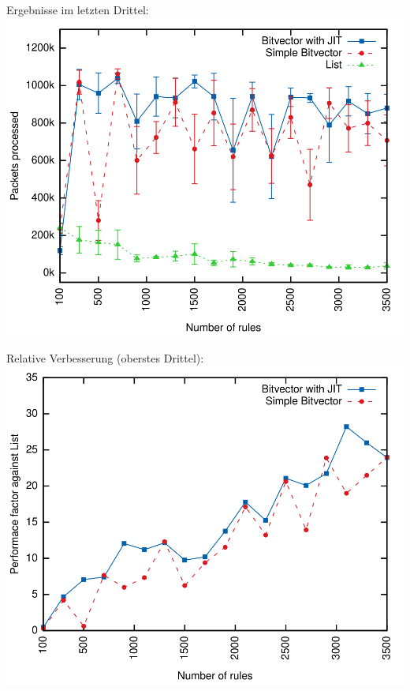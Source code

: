 \documentclass[xcolor=x11names,compress]{beamer}
\renewcommand{\(}{\begin{columns}}
\renewcommand{\)}{\end{columns}}
\newcommand{\<}[1]{\begin{column}{#1}}
\renewcommand{\>}{\end{column}}
\begin{document}
\begin{frame}[noframenumbering]
  Ergebnisse im letzten Drittel:
  \includegraphics[height=0.9\textheight]{figures/eval_w}
\end{frame}

\begin{frame}[noframenumbering]
  Relative Verbesserung (oberstes Drittel):
  \includegraphics[height=0.9\textheight]{figures/eval_b_relative}
\end{frame}
\end{document}
